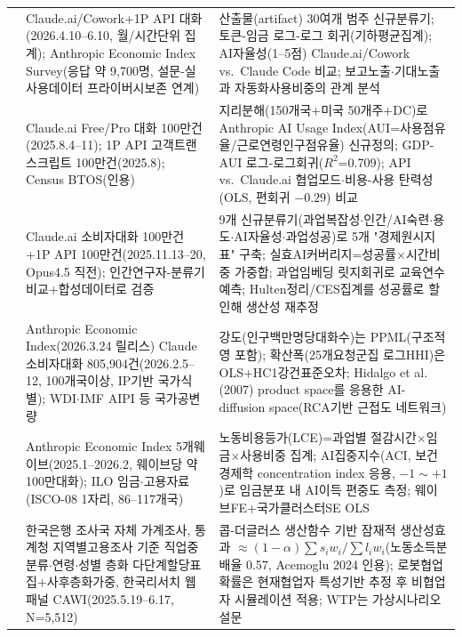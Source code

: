 \documentclass[11pt]{article}
\begin{document}
\begin{longtable}{L{2.5cm}L{6.4cm}L{6.4cm}}
\citet{massenkoff-2026-cadences} &
Claude.ai/Cowork+1P API 대화(2026.4.10--6.10, 월/시간단위 집계); Anthropic Economic Index Survey(응답 약 9,700명, 설문-실사용데이터 프라이버시보존 연계) &
산출물(artifact) 30여개 범주 신규분류기; 토큰-임금 로그-로그 회귀(기하평균집계); AI자율성(1--5점) Claude.ai/Cowork vs.\ Claude Code 비교; 보고노출$\cdot$기대노출과 자동화사용비중의 관계 분석\\

\citet{appel-2025-uneven-geographic-and-enterprise-ai} &
Claude.ai Free/Pro 대화 100만건(2025.8.4--11); 1P API 고객트랜스크립트 100만건(2025.8); Census BTOS(인용) &
지리분해(150개국+미국 50개주+DC)로 Anthropic AI Usage Index(AUI=사용점유율/근로연령인구점유율) 신규정의; GDP-AUI 로그-로그회귀($R^2$=0.709); API vs.\ Claude.ai 협업모드$\cdot$비용-사용 탄력성(OLS, 편회귀 $-0.29$) 비교\\

\citet{appel-2026-economic-primitives} &
Claude.ai 소비자대화 100만건+1P API 100만건(2025.11.13--20, Opus4.5 직전); 인간연구자-분류기 비교+합성데이터로 검증 &
9개 신규분류기(과업복잡성$\cdot$인간/AI숙련$\cdot$용도$\cdot$AI자율성$\cdot$과업성공)로 5개 "경제원시지표" 구축; 실효AI커버리지=성공률$\times$시간비중 가중합; 과업임베딩 릿지회귀로 교육연수 예측; Hulten정리/CES집계를 성공률로 할인해 생산성 재추정\\

\citet{fan-2026-what-countries-use-ai-and} &
Anthropic Economic Index(2026.3.24 릴리스) Claude소비자대화 805,904건(2026.2.5--12, 100개국이상, IP기반 국가식별); WDI$\cdot$IMF AIPI 등 국가공변량 &
강도(인구백만명당대화수)는 PPML(구조적 영 포함); 확산폭(25개요청군집 로그HHI)은 OLS+HC1강건표준오차; Hidalgo et al.(2007) product space를 응용한 AI-diffusion space(RCA기반 근접도 네트워크)\\

\citet{fan-2026-aggregate-gains-from-ai} &
Anthropic Economic Index 5개웨이브(2025.1--2026.2, 웨이브당 약 100만대화); ILO 임금$\cdot$고용자료(ISCO-08 1자리, 86--117개국) &
노동비용등가(LCE)=과업별 절감시간$\times$임금$\times$사용비중 집계; AI집중지수(ACI, 보건경제학 concentration index 응용, $-1\sim+1$)로 임금분포 내 AI이득 편중도 측정; 웨이브FE+국가클러스터SE OLS\\

\citet{bok-2025-rapid-ai-diffusion-productivity-effects} &
한국은행 조사국 자체 가계조사, 통계청 지역별고용조사 기준 직업중분류$\cdot$연령$\cdot$성별 층화 다단계할당표집+사후층화가중, 한국리서치 웹패널 CAWI(2025.5.19--6.17, N=5,512) &
콥-더글러스 생산함수 기반 잠재적 생산성효과 $\approx(1-\alpha)\sum s_iw_i/\sum l_iw_i$(노동소득분배율 0.57, Acemoglu 2024 인용); 로봇협업확률은 현재협업자 특성기반 추정 후 비협업자 시뮬레이션 적용; WTP는 가상시나리오 설문\\


\end{longtable}
\end{document}
